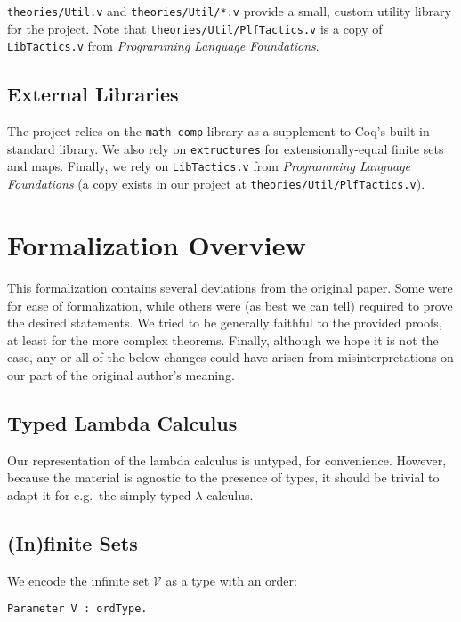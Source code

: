 \documentclass{article}
\begin{document}
\verb|theories/Util.v| and \verb|theories/Util/*.v| provide a small, custom utility library for the
project. Note that \verb|theories/Util/PlfTactics.v| is a copy of
\verb|LibTactics.v| from \emph{Programming Language Foundations}.

\subsection{External Libraries}

The project relies on the \verb|math-comp| library as a supplement to Coq's built-in standard
library. We also rely on \verb|extructures| for extensionally-equal finite sets and maps. Finally, we
rely on \verb|LibTactics.v| from \emph{Programming Language Foundations} (a copy exists in our
project at \verb|theories/Util/PlfTactics.v|).

\section{Formalization Overview}

This formalization contains several deviations from the original paper. Some were for ease of
formalization, while others were (as best we can tell) required to prove the desired statements.
We tried to be generally faithful to the provided proofs, at least for the more complex theorems.
Finally, although we hope it is not the case, any or all of the below changes could have arisen from
misinterpretations on our part of the original author's meaning.

\subsection{Typed Lambda Calculus}

Our representation of the lambda calculus is untyped, for convenience. However, because the material
is agnostic to the presence of types, it should be trivial to adapt it for e.g.\ the simply-typed
$\lambda$-calculus.

\subsection{(In)finite Sets}

We encode the infinite set $\mathcal{V}$ as a type with an order:

\begin{verbatim}
Parameter V : ordType.
\end{verbatim}
\end{document}
